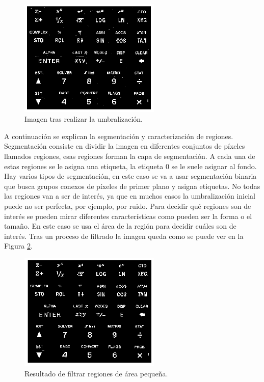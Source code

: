 \begin{figure}[h]
\centering
\includegraphics[width=0.6\textwidth]{imagenes/thresholding}
\caption{Imagen tras realizar la umbralización.}
\label{thresholding}
\end{figure}
A continuación se explican la segmentación y caracterización de regiones. Segmentación consiste en dividir la imagen en diferentes conjuntos de píxeles llamados regiones, esas regiones forman la capa de segmentación. A cada una de estas regiones se le asigna una etiqueta, la etiqueta 0 se le suele asignar al fondo.\\

Hay varios tipos de segmentación, en este caso se va a usar segmentación binaria que busca grupos conexos de píxeles de primer plano y asigna etiquetas. No todas las regiones van a ser de interés, ya que en muchos casos la umbralización inicial puede no ser perfecta, por ejemplo, por ruido. Para decidir qué regiones son de interés se pueden mirar diferentes características como pueden ser la forma o el tamaño. En este caso se usa el área de la región para decidir cuáles son de interés. Tras un proceso de filtrado la imagen queda como se puede ver en la Figura \ref{filtersmallareas}.\\


\begin{figure}[h]
\centering
\includegraphics[width=0.6\textwidth]{imagenes/filtersmallareas}
\caption{Resultado de filtrar regiones de área pequeña.}
\label{filtersmallareas}
\end{figure}


